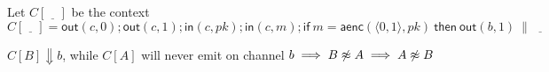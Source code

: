Let $C[\underline{\quad\!}]$ be the context
    $$
    C[\underline{\quad\!}] =
    \mathsf{out}(c, 0);
    \mathsf{out}(c, 1);
    \mathsf{in}(c, pk);
    \mathsf{in}(c, m);
    \mathsf{if}\ m = \mathsf{aenc}(\langle 0, 1 \rangle, pk)\ \mathsf{then}\
    \mathsf{out}(b, 1)
    \ \|\ \underline{\quad\!}
    $$

\noindent
$C[B] \Downarrow b$, while $C[A]$ will never emit on channel $b \implies B \centernot\approx A \implies A \centernot\approx B$
